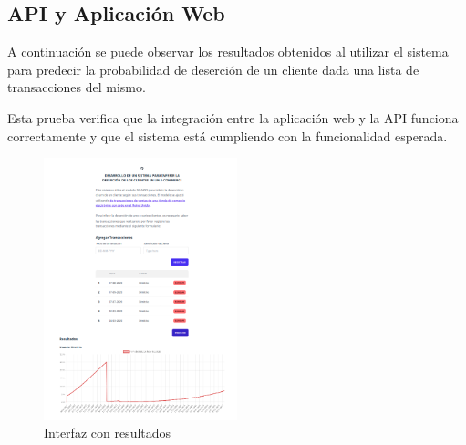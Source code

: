 \subsection{API y Aplicación Web}

A continuación se puede observar los resultados obtenidos al utilizar el sistema para predecir la probabilidad de deserción de un cliente dada una lista de transacciones del mismo.

	Esta prueba verifica que la integración entre la aplicación web y la API funciona correctamente y que el sistema está cumpliendo con la funcionalidad esperada.
	
\begin{figure}[H]
	\centering \includegraphics[width=0.50\textwidth]{images/7.png}
	\caption{Interfaz con resultados}
	\label{fig:ui2}
\end{figure}